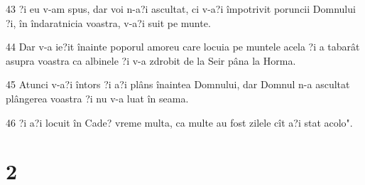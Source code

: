 \par 43 ?i eu v-am spus, dar voi n-a?i ascultat, ci v-a?i împotrivit poruncii Domnului ?i, în îndaratnicia voastra, v-a?i suit pe munte.
\par 44 Dar v-a ie?it înainte poporul amoreu care locuia pe muntele acela ?i a tabarât asupra voastra ca albinele ?i v-a zdrobit de la Seir pâna la Horma.
\par 45 Atunci v-a?i întors ?i a?i plâns înaintea Domnului, dar Domnul n-a ascultat plângerea voastra ?i nu v-a luat în seama.
\par 46 ?i a?i locuit în Cade? vreme multa, ca multe au fost zilele cît a?i stat acolo".

\chapter{2}

